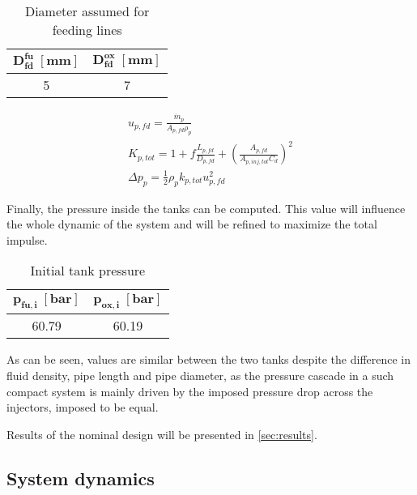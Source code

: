 \begin{table}[H]
    \renewcommand{\arraystretch}{1.5}
    \centering
    \begin{tabular}{|c|c|}
        \hline
        $\boldsymbol{D_{fd}^{fu} \; [\textbf{mm}]}$ & $\boldsymbol{D_{fd}^{ ox} \; [\textbf{mm}]}$ \\
        \hline
        \hline
        5 & 7 \\
        \hline
    \end{tabular}
    \caption{Diameter assumed for feeding lines}
    \label{table:diameter_fd}
\end{table}
\vspace{-1cm}
\begin{gather}
         u_{p,fd} = \frac{\dot{m}_p}{A_{p, fd}\rho_p}
        \label{eq:speed}
        \\
        K_{p, tot} = 1 + f \frac{L_{p,fd}}{D_{p,fd}} + \left(\frac{A_{p, fd}}{A_{p,inj, tot}C_d}\right)^2
       \label{eq:feeding_losses}
       \\
       \Delta p_{p} = \frac{1}{2}\rho_p k_{p, tot} u_{p,fd}^2 
       \label{eq:dp_tot}
\end{gather}

Finally, the pressure inside the tanks can be computed. This value will influence the whole dynamic of the system and will be refined to maximize the total impulse.

\begin{table}[H]
    \renewcommand{\arraystretch}{1.5}
    \centering
    \begin{tabular}{|c|c|}
        \hline
        $\boldsymbol{p_{fu,i}} \; [\textbf{bar}]$ & $\boldsymbol{p_{ox,i}\; [\textbf{bar}]}$ \\
        \hline
        \hline
        60.79 & 60.19 \\
        \hline
    \end{tabular}
    \caption{Initial tank pressure}
    \label{table:tk_press}
\end{table}
As can be seen, values are similar between the two tanks despite the difference in fluid density, pipe length and pipe diameter, as the pressure cascade in a such compact system is mainly driven by the imposed pressure drop across the injectors, imposed to be equal.

Results of the nominal design will be presented in \autoref{sec:results}.
 
\subsection{System dynamics}
\label{subsec:dynamics}

